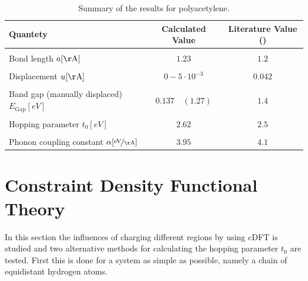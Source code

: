 \begin{table}[]
	\centering
	\begin{tabular}{l|c|c}
	Quantety & Calculated Value & Literature Value (\cite{PhysRevLett.42.1698, doi:10.1021/cr990357p})\\
	\hline \hline
	&&\\[-.3cm]
	Bond length \hfill$a [\unit{\AA}]$ & $1.23$ & $1.2$\\ \hline&&\\[-.3cm]
	Displacement \hfill$u [\unit{\AA}]$& $0 - 5\cdot10^{-3}$ & $0.042$\\ \hline&&\\[-.3cm]
	Band gap (manually displaced)\hfill$E_\text{Gap} [\unit{eV}]$ & $0.137\quad(1.27)$ & $1.4$\\ \hline &&\\[-.3cm]
	Hopping parameter \hfill$t_0 [\unit{eV}]$ & $2.62$ & $2.5$ \\ \hline&&\\[-.3cm]
	Phonon coupling constant \hspace*{2cm}$\alpha [\unitfrac{eV}{\AA}]$& $3.95$ & $4.1$
	\end{tabular}
	\caption{Summary of the results for polyacetylene.}
	\label{table_summary_polyacetylene}
\end{table}


\section{Constraint Density Functional Theory}
\label{section_constraint_density_functonal_theory}
In this section the influences of charging different regions by using cDFT is studied and two alternative methods for calculating the hopping parameter $t_0$ are tested. First this is done for a system as simple as possible, namely a chain of equidistant hydrogen atoms.


